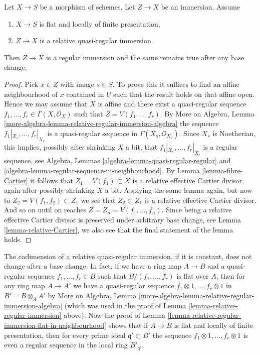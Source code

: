 \begin{lemma}
\label{lemma-relative-regular-immersion-flat-in-neighbourhood}
Let $X \to S$ be a morphism of schemes.
Let $Z \to X$ be an immersion.
Assume
\begin{enumerate}
\item $X \to S$ is flat and locally of finite presentation,
\item $Z \to X$ is a relative quasi-regular immersion.
\end{enumerate}
Then $Z \to X$ is a regular immersion and
the same remains true after any base change.
\end{lemma}

\begin{proof}
Pick $x \in Z$ with image $s \in S$. To prove this it suffices to
find an affine neighbourhood of $x$ contained in $U$ such that the
result holds on that affine open. Hence we may assume that $X$ is affine
and there exist a quasi-regular sequence
$f_1, \ldots, f_r \in \Gamma(X, \mathcal{O}_X)$
such that $Z = V(f_1, \ldots, f_r)$. By
More on Algebra, Lemma
\ref{more-algebra-lemma-relative-regular-immersion-algebra}
the sequence $f_1|_{X_s}, \ldots, f_r|_{X_s}$ is a
quasi-regular sequence in $\Gamma(X_s, \mathcal{O}_{X_s})$.
Since $X_s$ is Noetherian, this implies, possibly after shrinking
$X$ a bit, that $f_1|_{X_s}, \ldots, f_r|_{X_s}$ is a regular
sequence, see
Algebra, Lemmas \ref{algebra-lemma-quasi-regular-regular} and
\ref{algebra-lemma-regular-sequence-in-neighbourhood}.
By
Lemma \ref{lemma-fibre-Cartier}
it follows that $Z_1 = V(f_1) \subset X$ is a relative effective
Cartier divisor, again after possibly shrinking $X$ a bit.
Applying the same lemma again, but now to $Z_2 = V(f_1, f_2) \subset Z_1$
we see that $Z_2 \subset Z_1$ is a relative effective Cartier divisor.
And so on until on reaches $Z = Z_n = V(f_1, \ldots, f_n)$.
Since being a relative effective Cartier divisor is preserved under
arbitrary base change, see
Lemma \ref{lemma-relative-Cartier},
we also see that the final statement of the lemma holds.
\end{proof}

\begin{remark}
\label{remark-relative-regular-immersion-elements}
The codimension of a relative quasi-regular immersion,
if it is constant, does not change after a base change.
In fact, if we have a ring map $A \to B$ and a quasi-regular
sequence $f_1, \ldots, f_r \in B$ such that $B/(f_1, \ldots, f_r)$
is flat over $A$, then for any ring map $A \to A'$
we have a quasi-regular sequence 
$f_1 \otimes 1, \ldots, f_r \otimes 1$ in $B' = B \otimes_A A'$
by More on Algebra, Lemma
\ref{more-algebra-lemma-relative-regular-immersion-algebra}
(which was used in the proof of
Lemma \ref{lemma-relative-regular-immersion} above).
Now the proof of
Lemma \ref{lemma-relative-regular-immersion-flat-in-neighbourhood}
shows that if $A \to B$ is flat and locally of finite
presentation, then for every prime ideal $\mathfrak q' \subset B'$
the sequence
$f_1 \otimes 1, \ldots, f_r \otimes 1$ is even a
regular sequence in the local ring $B'_{\mathfrak q'}$.
\end{remark}

